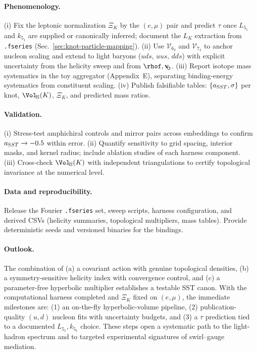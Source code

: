 \documentclass[11pt, preprint,titlepage]{revtex4-2}
\newcommand{\swirlarrow}{\!\!\scriptsize\boldsymbol{\circlearrowleft}}
\newcommand{\vswirl}{\mathbf{v}_{\swirlarrow}}
\begin{document}
    \paragraph{Phenomenology.}
    (i) Fix the leptonic normalization \(\Xi_K\) by the \((e,\mu)\) pair and predict \(\tau\) once \(L_{5_1}\) and \(k_{5_1}\) are supplied or canonically inferred; document the \(L_K\) extraction from \texttt{.fseries} (Sec.~\ref{sec:knot-particle-mapping}).
    (ii) Use \(\mathcal{V}_{6_2}\) and \(\mathcal{V}_{7_4}\) to anchor nucleon scaling and extend to light baryons (\(uds,\,uus,\,dds\)) with explicit uncertainty from the helicity sweep and from \(\rhof,\vswirl\).
    (iii) Report isotope mass systematics in the toy aggregator (Appendix~E), separating binding-energy systematics from constituent scaling.
    (iv) Publish falsifiable tables: \(\{a_{\textrm SST},\sigma\}\) per knot, \(\Vol_{\!\mathbb{H}}(K)\), \(\Xi_K\), and predicted mass ratios.

    \paragraph{Validation.}
    (i) Stress-test amphichiral controls and mirror pairs across embeddings to confirm \(a_{\textrm SST}\rightarrow -0.5\) within error.
    (ii) Quantify sensitivity to grid spacing, interior masks, and kernel radius; include ablation studies of each harness component.
    (iii) Cross-check \(\Vol_{\!\mathbb{H}}(K)\) with independent triangulations to certify topological invariance at the numerical level.

    \paragraph{Data and reproducibility.}
    Release the Fourier \texttt{.fseries} set, sweep scripts, harness configuration, and derived CSVs (helicity summaries, topological multipliers, mass tables). Provide deterministic seeds and versioned binaries for the bindings.

    \paragraph{Outlook.}
    The combination of (a) a covariant action with genuine topological densities, (b) a symmetry-sensitive helicity index with convergence control, and (c) a parameter-free hyperbolic multiplier establishes a testable SST canon. With the computational harness completed and \(\Xi_K\) fixed on \((e,\mu)\), the immediate milestones are: (1) an on-the-fly hyperbolic-volume pipeline, (2) publication-quality \((u,d)\) nucleon fits with uncertainty budgets, and (3) a \(\tau\) prediction tied to a documented \(L_{5_1},k_{5_1}\) choice. These steps open a systematic path to the light-hadron spectrum and to targeted experimental signatures of swirl–gauge mediation.
\end{document}
